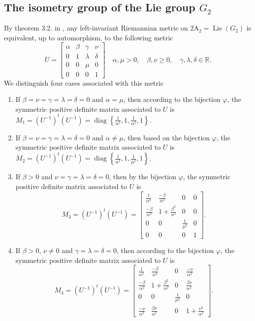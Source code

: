 \documentclass[12pt,a4paper,twoside]{article}
\theoremstyle{definition}
\begin{document}
\subsection{The isometry group of the Lie group $G_2$}
By theorem 3.2. in \cite{aitbenhaddou2025classification}, any left-invariant Riemannian metric on $\operatorname{2A_2} = \operatorname{Lie}(G_2)$ is equivalent, up to automorphism, to the following metric
$$U = \begin{bmatrix}
\alpha & \beta & \gamma & \nu\\
0 & 1 & \lambda & \delta\\
0 & 0 & \mu & 0\\
0 & 0 & 0 & 1
\end{bmatrix} \quad \alpha, \mu > 0, \quad \beta, \nu \geq 0, \quad \gamma, \lambda, \delta \in \mathbb{R}.$$
We distinguish four cases associated with this metric
\begin{enumerate}
\item If $\beta = \nu = \gamma = \lambda = \delta = 0$ and $\alpha = \mu$, then according to the bijection $\varphi$, the symmetric positive definite matrix associated to $U$ is\\ $M_1 = (U^{-1})^t(U^{-1}) = \operatorname{diag}\left\lbrace \frac{1}{\alpha^2}, 1, \frac{1}{\alpha^2}, 1\right\rbrace$.
\item If $\beta = \nu = \gamma = \lambda = \delta = 0$ and $\alpha \neq \mu$, then based on the bijection $\varphi$, the symmetric positive definite matrix associated to $U$ is\\
$M_2 = (U^{-1})^t(U^{-1}) = \operatorname{diag}\left\lbrace \frac{1}{\alpha^2}, 1, \frac{1}{\mu^2}, 1\right\rbrace$.
\item If $\beta > 0$ and $\nu = \gamma = \lambda = \delta = 0$, then by the bijection $\varphi$, the symmetric positive definite matrix associated to $U$ is 
$$M_3 = (U^{-1})^t(U^{-1}) = \begin{bmatrix}
\frac{1}{\alpha^2} & \frac{-\beta}{\alpha^2} & 0 & 0\\
\frac{-\beta}{\alpha^2} & 1 + \frac{\beta^2}{\alpha^2} & 0 & 0\\
0 & 0 & \frac{1}{\mu^2} & 0\\
0 & 0 & 0 & 1
\end{bmatrix}.$$
\item If $\beta > 0$, $\nu \neq 0$ and $\gamma = \lambda = \delta = 0$, then according to the bijection $\varphi$, the symmetric positive definite matrix associated to $U$ is 
$$M_4 = (U^{-1})^t(U^{-1}) = \begin{bmatrix}
\frac{1}{\alpha^2} & \frac{-\beta}{\alpha^2} & 0 & \frac{-\nu}{\alpha^2}\\
\frac{-\beta}{\alpha^2} & 1 + \frac{\beta^2}{\alpha^2} & 0 & \frac{\beta\nu}{\alpha^2}\\
0 & 0 & \frac{1}{\mu^2} & 0\\
\frac{-\nu}{\alpha^2} & \frac{\beta\nu}{\alpha^2} & 0 & 1 + \frac{\nu^2}{\alpha^2}
\end{bmatrix}.$$
\end{enumerate}
\end{document}
